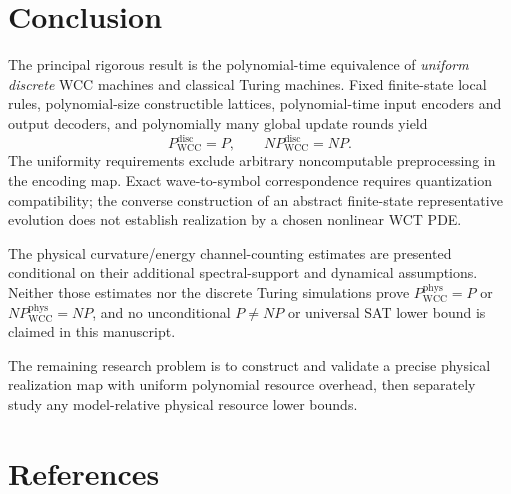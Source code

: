 \documentclass[12pt]{article}
\begin{document}
\section{Conclusion}

The principal rigorous result is the polynomial-time equivalence of
\emph{uniform discrete} WCC machines and classical Turing machines.
Fixed finite-state local rules, polynomial-size constructible lattices,
polynomial-time input encoders and output decoders, and polynomially
many global update rounds yield
\[
 P_{\mathrm{WCC}}^{\mathrm{disc}}=P,
 \qquad NP_{\mathrm{WCC}}^{\mathrm{disc}}=NP.
\]
The uniformity requirements exclude arbitrary noncomputable
preprocessing in the encoding map. Exact wave-to-symbol correspondence
requires quantization compatibility; the converse construction of an
abstract finite-state representative evolution does not establish
realization by a chosen nonlinear WCT PDE.

The physical curvature/energy channel-counting estimates are presented
conditional on their additional spectral-support and dynamical
assumptions. Neither those estimates nor the discrete Turing simulations
prove $P_{\mathrm{WCC}}^{\mathrm{phys}}=P$ or
$NP_{\mathrm{WCC}}^{\mathrm{phys}}=NP$, and no unconditional
$P\ne NP$ or universal SAT lower bound is claimed in this manuscript.

The remaining research problem is to construct and validate a precise
physical realization map with uniform polynomial resource overhead,
then separately study any model-relative physical resource lower bounds.


\section*{References}
\end{document}

